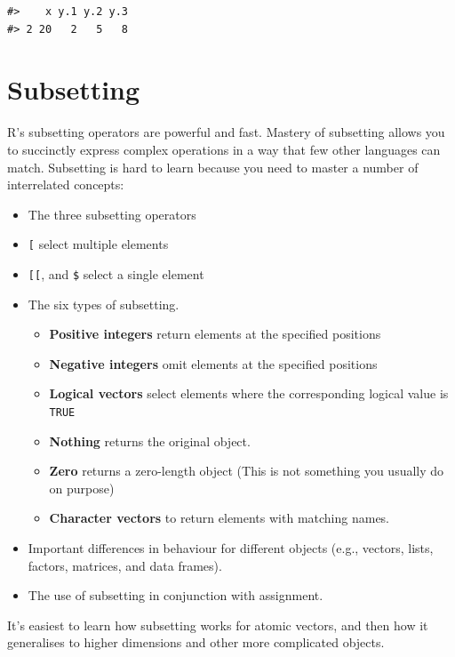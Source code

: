 \documentclass[]{book}
\providecommand{\tightlist}{%
  \setlength{\itemsep}{0pt}\setlength{\parskip}{0pt}}
\theoremstyle{definition}
\theoremstyle{definition}
\theoremstyle{definition}
\theoremstyle{remark}
\begin{document}
\begin{verbatim}
#>    x y.1 y.2 y.3
#> 2 20   2   5   8
\end{verbatim}

\chapter{Subsetting}\label{subsetting}

R's subsetting operators are powerful and fast. Mastery of subsetting
allows you to succinctly express complex operations in a way that few
other languages can match. Subsetting is hard to learn because you need
to master a number of interrelated concepts:

\begin{itemize}
\item
  The three subsetting operators
\item
  \texttt{{[}} select multiple elements
\item
  \texttt{{[}{[}}, and \texttt{\$} select a single element
\item
  The six types of subsetting.

  \begin{itemize}
  \tightlist
  \item
    \textbf{Positive integers} return elements at the specified
    positions
  \item
    \textbf{Negative integers} omit elements at the specified positions
  \item
    \textbf{Logical vectors} select elements where the corresponding
    logical value is \texttt{TRUE}
  \item
    \textbf{Nothing} returns the original object.
  \item
    \textbf{Zero} returns a zero-length object (This is not something
    you usually do on purpose)
  \item
    \textbf{Character vectors} to return elements with matching names.
  \end{itemize}
\item
  Important differences in behaviour for different objects (e.g.,
  vectors, lists, factors, matrices, and data frames).
\item
  The use of subsetting in conjunction with assignment.
\end{itemize}

It's easiest to learn how subsetting works for atomic vectors, and then
how it generalises to higher dimensions and other more complicated
objects.
\end{document}
